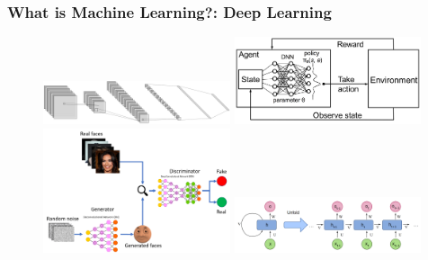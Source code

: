 \documentclass[11pt]{beamer}
\begin{document}
\begin{frame}
	\frametitle{What is Machine Learning?: Deep Learning}
	\begin{figure}
		\includegraphics[width=55mm,scale=0.5]{cnn}\hspace{2mm}
		\includegraphics[width=55mm,scale=0.5]{drl}
		\\[\smallskipamount]
		\includegraphics[width=55mm,scale=0.5]{gan}\hspace{2mm}
		\includegraphics[width=55mm,scale=0.5]{rnn}
	\end{figure}
\end{frame}
\end{document}
